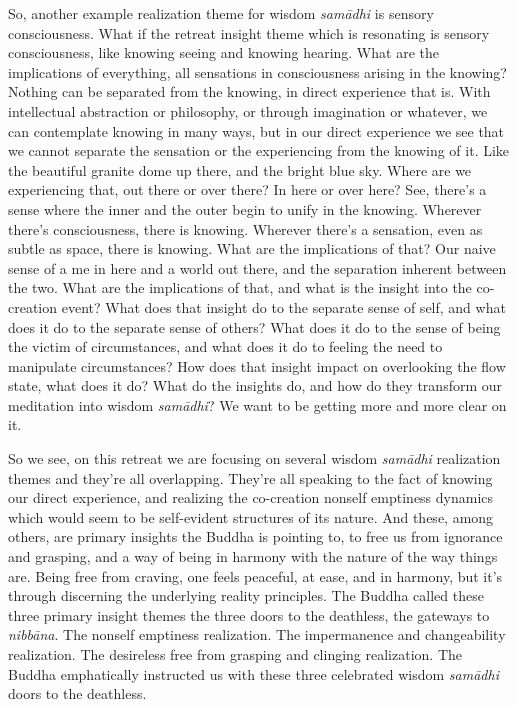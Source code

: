 \documentclass[12pt,openany]{book}
\begin{document}
So, another example realization theme for wisdom \textit{samādhi} is sensory consciousness. What if the retreat insight theme which is resonating is sensory consciousness, like knowing seeing and knowing hearing. What are the implications of everything, all sensations in consciousness arising in the knowing? Nothing can be separated from the knowing, in direct experience that is. With intellectual abstraction or philosophy, or through imagination or whatever, we can contemplate knowing in many ways, but in our direct experience we see that we cannot separate the sensation or the experiencing from the knowing of it. Like the beautiful granite dome up there, and the bright blue sky. Where are we experiencing that, out there or over there? In here or over here? See, there's a sense where the inner and the outer begin to unify in the knowing. Wherever there’s consciousness, there is knowing. Wherever there’s a sensation, even as subtle as space, there is knowing. What are the implications of that? Our naive sense of a me in here and a world out there, and the separation inherent between the two. What are the implications of that, and what is the insight into the co-creation event? What does that insight do to the separate sense of self, and what does it do to the separate sense of others? What does it do to the sense of being the victim of circumstances, and what does it do to feeling the need to manipulate circumstances? How does that insight impact on overlooking the flow state, what does it do? What do the insights do, and how do they transform our meditation into wisdom \textit{samādhi}? We want to be getting more and more clear on it.

So we see, on this retreat we are focusing on several wisdom \textit{samādhi} realization themes and they're all overlapping. They're all speaking to the fact of knowing our direct experience, and realizing the co-creation nonself emptiness dynamics which would seem to be self-evident structures of its nature. And these, among others, are primary insights the Buddha is pointing to, to free us from ignorance and grasping, and a way of being in harmony with the nature of the way things are. Being free from craving, one feels peaceful, at ease, and in harmony, but it's through discerning the underlying reality principles. The Buddha called these three primary insight themes the three doors to the deathless, the gateways to \textit{nibbāna}. The nonself emptiness realization. The impermanence and changeability realization. The desireless free from grasping and clinging realization. The Buddha emphatically instructed us with these three celebrated wisdom \textit{samādhi} doors to the deathless.
\end{document}
